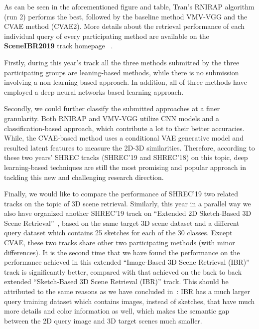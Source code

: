 \documentclass[../main.tex]{subfiles}
\begin{document}
As can be seen in the aforementioned figure and table, Tran's RNIRAP algorithm (run 2) performs the best, followed by the baseline method VMV-VGG and the CVAE method (CVAE2). More details about the retrieval performance of each individual query of every participating method are available on the \textbf{SceneIBR2019} track homepage~\cite{SceneIBR19} . 

Firstly, during this year's track all the three methods submitted by the three participating groups are leaning-based methods, while there is no submission involving a non-learning based approach. In addition, all of three methods have employed a deep neural networks based learning approach. 

Secondly, we could further classify the submitted approaches at a finer granularity. Both RNIRAP and VMV-VGG utilize CNN models and a classification-based approach, which contribute a lot to their better accuracies. While, the CVAE-based method uses a conditional VAE generative model and resulted latent features to measure the 2D-3D similarities. Therefore, according to these two years' SHREC tracks (SHREC'19 and SHREC'18) on this topic, deep learning-based techniques are still the most promising and popular approach in tackling this new and challenging research direction. 

Finally, we would like to compare the performance of SHREC'19 two related tracks on the topic of 3D scene retrieval. Similarly, this year in a parallel way we also have organized another SHREC'19 track on ``Extended 2D Sketch-Based 3D Scene Retrieval''~\cite{SceneIBR19}, based on the same target 3D scene dataset and a different query dataset which contains 25 sketches for each of the 30 classes. Except CVAE, these two tracks share other two participating methods (with minor differences). It is the second time that we have found the performance on the performance achieved in this extended ``Image-Based 3D Scene Retrieval (IBR)'' track is significantly better, compared with that achieved on the back to back extended ``Sketch-Based 3D Scene Retrieval (IBR)'' track. This should be attributed to the same reasons as we have concluded in~\cite{SceneIBR19}: IBR has a much larger query training dataset which contains images, instead of sketches, that have much more details and color information as well, which makes the semantic gap between the 2D query image and 3D target scenes much smaller.  
\end{document}
